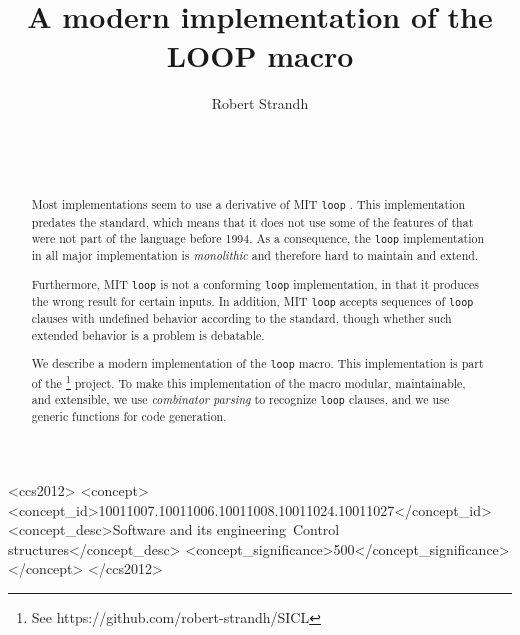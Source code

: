 \documentclass{sig-alternate-05-2015}
\def\inputtex#1{}
\def\mitloop{MIT \texttt{loop}}
\begin{document}
\title{A modern implementation of the LOOP macro}
\author{\alignauthor
Robert Strandh\\
\\
\\
\\
}

\maketitle

\begin{abstract}
Most \commonlisp{} \cite{ansi:common:lisp} implementations seem to use
a derivative of \mitloop{} \cite{Burke:Moon:MIT.loop}.  This
implementation predates the \commonlisp{} standard, which means that
it does not use some of the features of \commonlisp{} that were not
part of the language before 1994.  As a consequence, the \texttt{loop}
implementation in all major \commonlisp{} implementation is
\emph{monolithic} and therefore hard to maintain and extend.

Furthermore, \mitloop{} is not a conforming \texttt{loop}
implementation, in that it produces the wrong result for certain
inputs.  In addition, \mitloop{} accepts sequences of \texttt{loop}
clauses with undefined behavior according to the standard, though
whether such extended behavior is a problem is debatable.

We describe a modern implementation of the \commonlisp{} \texttt{loop}
macro.  This implementation is part of the \sicl{}%
\footnote{See https://github.com/robert-strandh/SICL}
project.  To make
this implementation of the macro modular, maintainable, and
extensible, we use \emph{combinator parsing} to recognize
\texttt{loop} clauses, and we use \clos{} generic functions for code
generation.
\end{abstract}

\begin{CCSXML}
  <ccs2012>
  <concept>
  <concept_id>10011007.10011006.10011008.10011024.10011027</concept_id>
  <concept_desc>Software and its engineering~Control structures</concept_desc>
  <concept_significance>500</concept_significance>
  </concept>
  </ccs2012>
\end{CCSXML}


\printccsdesc


\inputtex{sec-introduction.tex}
\inputtex{sec-previous.tex}
\inputtex{sec-our-method.tex}
\inputtex{sec-benefits.tex}
\inputtex{sec-conclusions.tex}
\inputtex{sec-acknowledgments.tex}
\inputtex{app-loop.tex}



\end{document}
